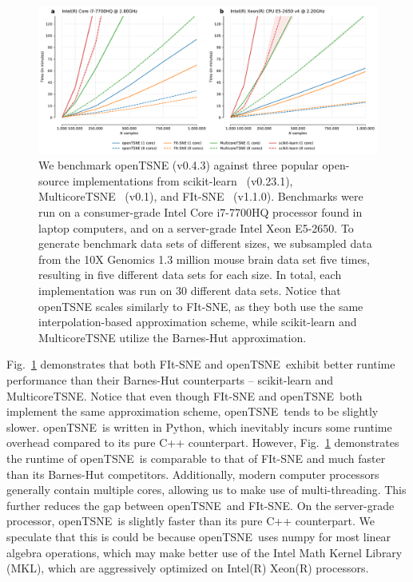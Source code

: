 \documentclass[twocolumn]{bmcart}
\newcommand{\opentsne}{\textsf{openTSNE}}
\begin{document}
\begin{figure}[htbp]
  \includegraphics[width=\textwidth]{benchmarks}
  \caption{\label{fig:benchmarks}We benchmark openTSNE (v0.4.3) against three
	popular open-source implementations from
	scikit-learn~\cite{pedregosa2011scikit} (v0.23.1),
	MulticoreTSNE~\cite{Ulyanov2016} (v0.1), and
	FIt-SNE~\cite{linderman2019fast} (v1.1.0). Benchmarks were run on a
	consumer-grade Intel Core i7-7700HQ processor found in laptop
	computers, and on a server-grade Intel Xeon E5-2650. To generate
	benchmark data sets of different sizes, we subsampled data from the 10X
	Genomics 1.3 million mouse brain data set five times, resulting in five
	different data sets for each size. In total, each implementation was
	run on 30 different data sets. Notice that openTSNE scales similarly to
	FIt-SNE, as they both use the same interpolation-based approximation
	scheme, while scikit-learn and MulticoreTSNE utilize the Barnes-Hut
	approximation.}
\end{figure}

Fig.~\ref{fig:benchmarks} demonstrates that both \textsf{FIt-SNE} and
\opentsne\ exhibit better runtime performance than their Barnes-Hut
counterparts -- \textsf{scikit-learn} and \textsf{MulticoreTSNE}. Notice that
even though \textsf{FIt-SNE} and \opentsne\ both implement the same
approximation scheme, \opentsne\ tends to be slightly slower. \opentsne\ is
written in Python, which inevitably incurs some runtime overhead compared to
its pure C++ counterpart. However, Fig.~\ref{fig:benchmarks} demonstrates the
runtime of \opentsne\ is comparable to that of \textsf{FIt-SNE} and much faster
than its Barnes-Hut competitors. Additionally, modern computer processors
generally contain multiple cores, allowing us to make use of multi-threading.
This further reduces the gap between \opentsne\ and \textsf{FIt-SNE}. On the
server-grade processor, \opentsne\ is slightly faster than its pure C++
counterpart. We speculate that this is could be because \opentsne\ uses
\textsf{numpy} for most linear algebra operations, which may make better use of
the Intel Math Kernel Library (MKL), which are aggressively optimized on
Intel(R) Xeon(R) processors.
\end{document}
